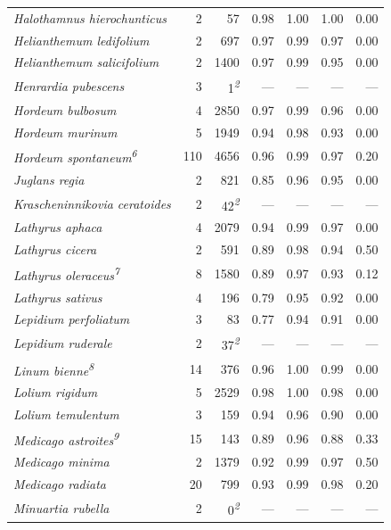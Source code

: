 \documentclass[
  authoryear,
  preprint]{elsarticle}
\begin{document}
\begin{longtable}{@{\extracolsep{\fill}}lrrrrrr}
{\itshape Halothamnus hierochunticus} & 2 & 57 & 0.98 & 1.00 & 1.00 & 0.00 \\ 
{\itshape Helianthemum ledifolium} & 2 & 697 & 0.97 & 0.99 & 0.97 & 0.00 \\ 
{\itshape Helianthemum salicifolium} & 2 & 1400 & 0.97 & 0.99 & 0.95 & 0.00 \\ 
{\itshape Henrardia pubescens} & 3 & 1\textsuperscript{\textit{2}} & — & — & — & — \\ 
{\itshape Hordeum bulbosum} & 4 & 2850 & 0.97 & 0.99 & 0.96 & 0.00 \\ 
{\itshape Hordeum murinum} & 5 & 1949 & 0.94 & 0.98 & 0.93 & 0.00 \\ 
{\itshape Hordeum spontaneum}\textsuperscript{\textit{6}} & 110 & 4656 & 0.96 & 0.99 & 0.97 & 0.20 \\ 
{\itshape Juglans regia} & 2 & 821 & 0.85 & 0.96 & 0.95 & 0.00 \\ 
{\itshape Krascheninnikovia ceratoides} & 2 & 42\textsuperscript{\textit{2}} & — & — & — & — \\ 
{\itshape Lathyrus aphaca} & 4 & 2079 & 0.94 & 0.99 & 0.97 & 0.00 \\ 
{\itshape Lathyrus cicera} & 2 & 591 & 0.89 & 0.98 & 0.94 & 0.50 \\ 
{\itshape Lathyrus oleraceus}\textsuperscript{\textit{7}} & 8 & 1580 & 0.89 & 0.97 & 0.93 & 0.12 \\ 
{\itshape Lathyrus sativus} & 4 & 196 & 0.79 & 0.95 & 0.92 & 0.00 \\ 
{\itshape Lepidium perfoliatum} & 3 & 83 & 0.77 & 0.94 & 0.91 & 0.00 \\ 
{\itshape Lepidium ruderale} & 2 & 37\textsuperscript{\textit{2}} & — & — & — & — \\ 
{\itshape Linum bienne}\textsuperscript{\textit{8}} & 14 & 376 & 0.96 & 1.00 & 0.99 & 0.00 \\ 
{\itshape Lolium rigidum} & 5 & 2529 & 0.98 & 1.00 & 0.98 & 0.00 \\ 
{\itshape Lolium temulentum} & 3 & 159 & 0.94 & 0.96 & 0.90 & 0.00 \\ 
{\itshape Medicago astroites}\textsuperscript{\textit{9}} & 15 & 143 & 0.89 & 0.96 & 0.88 & 0.33 \\ 
{\itshape Medicago minima} & 2 & 1379 & 0.92 & 0.99 & 0.97 & 0.50 \\ 
{\itshape Medicago radiata} & 20 & 799 & 0.93 & 0.99 & 0.98 & 0.20 \\ 
{\itshape Minuartia rubella} & 2 & 0\textsuperscript{\textit{2}} & — & — & — & — \\ 

\end{longtable}
\end{document}
